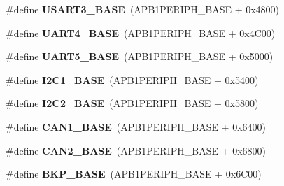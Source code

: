 \begin{DoxyCompactItemize}
\item 
\hypertarget{group___peripheral__memory__map_gabe0d6539ac0026d598274ee7f45b0251}{\#define {\bfseries U\-S\-A\-R\-T3\-\_\-\-B\-A\-S\-E}~(A\-P\-B1\-P\-E\-R\-I\-P\-H\-\_\-\-B\-A\-S\-E + 0x4800)}\label{group___peripheral__memory__map_gabe0d6539ac0026d598274ee7f45b0251}

\item 
\hypertarget{group___peripheral__memory__map_ga94d92270bf587ccdc3a37a5bb5d20467}{\#define {\bfseries U\-A\-R\-T4\-\_\-\-B\-A\-S\-E}~(A\-P\-B1\-P\-E\-R\-I\-P\-H\-\_\-\-B\-A\-S\-E + 0x4\-C00)}\label{group___peripheral__memory__map_ga94d92270bf587ccdc3a37a5bb5d20467}

\item 
\hypertarget{group___peripheral__memory__map_gaa155689c0e206e6994951dc3cf31052a}{\#define {\bfseries U\-A\-R\-T5\-\_\-\-B\-A\-S\-E}~(A\-P\-B1\-P\-E\-R\-I\-P\-H\-\_\-\-B\-A\-S\-E + 0x5000)}\label{group___peripheral__memory__map_gaa155689c0e206e6994951dc3cf31052a}

\item 
\hypertarget{group___peripheral__memory__map_gacd72dbffb1738ca87c838545c4eb85a3}{\#define {\bfseries I2\-C1\-\_\-\-B\-A\-S\-E}~(A\-P\-B1\-P\-E\-R\-I\-P\-H\-\_\-\-B\-A\-S\-E + 0x5400)}\label{group___peripheral__memory__map_gacd72dbffb1738ca87c838545c4eb85a3}

\item 
\hypertarget{group___peripheral__memory__map_ga04bda70f25c795fb79f163b633ad4a5d}{\#define {\bfseries I2\-C2\-\_\-\-B\-A\-S\-E}~(A\-P\-B1\-P\-E\-R\-I\-P\-H\-\_\-\-B\-A\-S\-E + 0x5800)}\label{group___peripheral__memory__map_ga04bda70f25c795fb79f163b633ad4a5d}

\item 
\hypertarget{group___peripheral__memory__map_gad8e45ea6c032d9fce1b0516fff9d8eaa}{\#define {\bfseries C\-A\-N1\-\_\-\-B\-A\-S\-E}~(A\-P\-B1\-P\-E\-R\-I\-P\-H\-\_\-\-B\-A\-S\-E + 0x6400)}\label{group___peripheral__memory__map_gad8e45ea6c032d9fce1b0516fff9d8eaa}

\item 
\hypertarget{group___peripheral__memory__map_gaf7b8267b0d439f8f3e82f86be4b9fba1}{\#define {\bfseries C\-A\-N2\-\_\-\-B\-A\-S\-E}~(A\-P\-B1\-P\-E\-R\-I\-P\-H\-\_\-\-B\-A\-S\-E + 0x6800)}\label{group___peripheral__memory__map_gaf7b8267b0d439f8f3e82f86be4b9fba1}

\item 
\hypertarget{group___peripheral__memory__map_gaa15d5a9f40794105397ba5ea567c4ae1}{\#define {\bfseries B\-K\-P\-\_\-\-B\-A\-S\-E}~(A\-P\-B1\-P\-E\-R\-I\-P\-H\-\_\-\-B\-A\-S\-E + 0x6\-C00)}\label{group___peripheral__memory__map_gaa15d5a9f40794105397ba5ea567c4ae1}


\end{DoxyCompactItemize}
